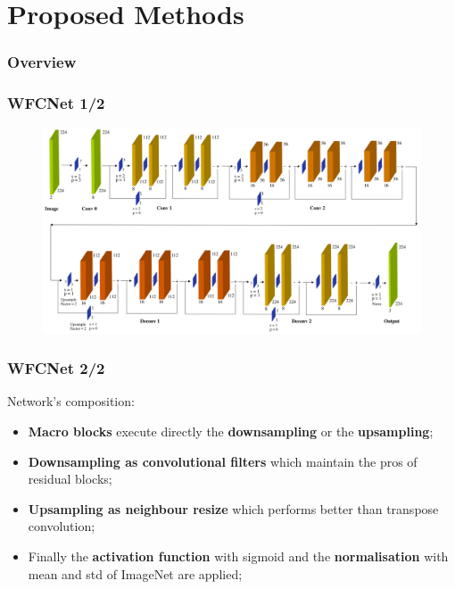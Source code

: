 \documentclass{beamer}
\begin{document}
\section{Proposed Methods}

\begin{frame}
\frametitle{Overview} 
	\tableofcontents[currentsection]
\end{frame}

\begin{frame}
\frametitle{WFCNet 1/2}

\begin{figure}
\includegraphics[width=\textwidth]{../schemi/wfcnet_esploso}
\end{figure}
 
\end{frame}

\begin{frame}
\frametitle{WFCNet 2/2}

Network's composition:
\begin{itemize}
\item \textbf{Macro blocks} execute directly the \textbf{downsampling} or the \textbf{upsampling};
\item \textbf{Downsampling as convolutional filters} which maintain the pros of residual blocks;
\item \textbf{Upsampling as neighbour resize} which performs better than transpose convolution;
\item Finally the \textbf{activation function} with sigmoid and the \textbf{normalisation} with mean and std of ImageNet are applied;
\end{itemize}
 
\end{frame}
\end{document}
